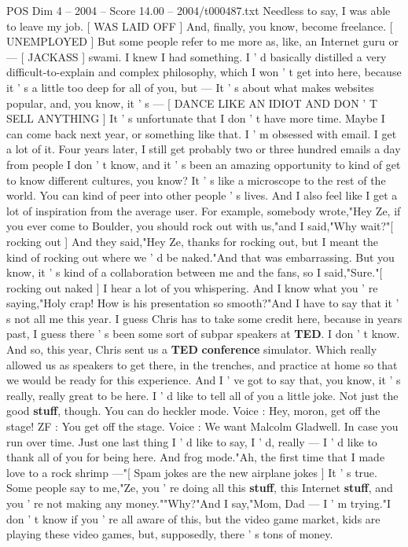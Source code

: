 \begin{textsample}{POS Dim 4 – 2004 – Score 14.00 – 2004/t000487.txt}
Needless to say, I was able to leave my job. [ WAS LAID OFF ] And, finally, you know, become freelance. [ UNEMPLOYED ] But some people refer to me more as, like, an Internet guru or — [ JACKASS ] swami.
I knew I had something.
I ' d basically distilled a very difficult-to-explain and complex philosophy, which I won ' t get into here, because it ' s a little too deep for all of you, but — It ' s about what makes websites popular, and, you know, it ' s — [ DANCE LIKE AN IDIOT AND DON ' T SELL ANYTHING ] It ' s unfortunate that I don ' t have more time.
Maybe I can come back next year, or something like that.
I ' m obsessed with email.
I get a lot of it.
Four years later, I still get probably two or three hundred emails a day from people I don ' t know, and it ' s been an amazing opportunity to kind of get to know different cultures, you know?
It ' s like a microscope to the rest of the world.
You can kind of peer into other people ' s lives.
And I also feel like I get a lot of inspiration from the average user.
For example, somebody wrote,"Hey Ze, if you ever come to Boulder, you should rock out with us,"and I said,"Why wait?"[ rocking out ] And they said,"Hey Ze, thanks for rocking out, but I meant the kind of rocking out where we ' d be naked."And that was embarrassing.
But you know, it ' s kind of a collaboration between me and the fans, so I said,"Sure."[ rocking out naked ] I hear a lot of you whispering.
And I know what you ' re saying,"Holy crap!
How is his presentation so smooth?"And I have to say that it ' s not all me this year.
I guess Chris has to take some credit here, because in years past, I guess there ' s been some sort of subpar speakers at \textbf{TED}.
I don ' t know.
And so, this year, Chris sent us a \textbf{TED} \textbf{conference} simulator.
Which really allowed us as speakers to get there, in the trenches, and practice at home so that we would be ready for this experience.
And I ' ve got to say that, you know, it ' s really, really great to be here.
I ' d like to tell all of you a little joke.
Not just the good \textbf{stuff}, though.
You can do heckler mode.
Voice : Hey, moron, get off the stage!
ZF : You get off the stage.
Voice : We want Malcolm Gladwell.
In case you run over time.
Just one last thing I ' d like to say, I ' d, really — I ' d like to thank all of you for being here.
And frog mode."Ah, the first time that I made love to a rock shrimp —"[ Spam jokes are the new airplane jokes ] It ' s true.
Some people say to me,"Ze, you ' re doing all this \textbf{stuff}, this Internet \textbf{stuff}, and you ' re not making any money.""Why?"And I say,"Mom, Dad — I ' m trying."I don ' t know if you ' re all aware of this, but the video game market, kids are playing these video games, but, supposedly, there ' s tons of money.

\end{textsample}
